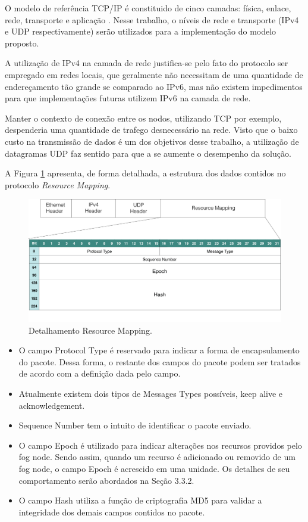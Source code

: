O modelo de referência TCP/IP é constituido de cinco camadas: física, enlace, rede, transporte e aplicação \cite{tanenbaum2011redes}.
Nesse trabalho, o níveis de rede e transporte (IPv4 e UDP respectivamente) serão utilizados para a implementação do modelo proposto.

A utilização de IPv4 na camada de rede justifica-se pelo fato do protocolo ser empregado em redes locais, que geralmente não necessitam de uma quantidade de endereçamento tão grande 
se comparado ao IPv6, mas não existem impedimentos para que implementações futuras utilizem IPv6 na camada de rede.

Manter o contexto de conexão entre os nodos, utilizando TCP por exemplo, despenderia uma quantidade de trafego desnecessário na rede.
Visto que o baixo custo na transmissão de dados é um dos objetivos desse trabalho, a utilização de datagramas UDP faz sentido para que a se aumente o desempenho da solução.

A Figura \ref{fig:fig12} apresenta, de forma detalhada, a estrutura dos dados contidos no protocolo \textit{Resource Mapping}.

\begin{figure}[htb!]
    \centering\includegraphics[width=.8\textwidth]{fig12.png}
    \caption[Detalhamento Resource Mapping]
    {\label{fig:fig12} Detalhamento Resource Mapping.}
\end{figure}

\begin{itemize}
\item O campo Protocol Type é reservado para indicar a forma de encapsulamento do pacote.
Dessa forma, o restante dos campos do pacote podem ser tratados de acordo com a definição dada pelo campo.
\item Atualmente existem dois tipos de Messages Types possíveis, keep alive e acknowledgement.
\item Sequence Number tem o intuito de identificar o pacote enviado.
\item O campo Epoch é utilizado para indicar alterações nos recursos providos pelo fog node.
Sendo assim, quando um recurso é adicionado ou removido de um fog node, o campo Epoch é acrescido em uma unidade. Os detalhes de seu comportamento serão abordados na Seção 3.3.2.
\item O campo Hash utiliza a função de criptografia MD5 para validar a integridade dos demais campos contidos no pacote.
\end{itemize}

